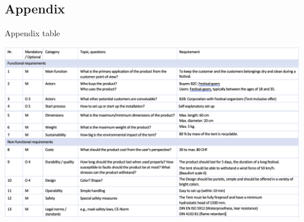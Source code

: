 \documentclass{article}
\begin{document}
\newpage
\thispagestyle{empty}
\begin{landscape}
    \section{Appendix}
    \begin{table}[ht!]
        \centering
        \caption{Appendix table}
        \label{tab:appendix}
        \includegraphics[width=1.5\textwidth]{media/appendix.png}
    \end{table}
\end{landscape}
\end{document}
